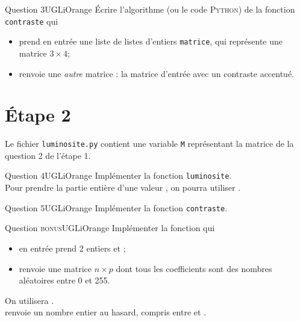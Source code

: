 \documentclass[a4paper,12pt,exos,firamath]{nsi}
\begin{document}
\begin{encadrecolore}{Question 3}{UGLiOrange}
\'Ecrire l'algorithme (ou le code \textsc{Python}) de la fonction \texttt{contraste} qui 
\begin{itemize}
	\item prend en entrée une liste de listes d'entiers \texttt{matrice}, qui représente une matrice $3\times 4$;
    \item renvoie une \textit{autre} matrice : la matrice d'entrée avec un contraste accentué.
\end{itemize}

\end{encadrecolore} 

\section*{\'Etape 2}

Le fichier \texttt{luminosite.py} contient une variable \texttt{M} représentant la matrice de la question 2 de l'étape 1.


\begin{encadrecolore}{Question 4}{UGLiOrange}
Implémenter la fonction \texttt{luminosite}.\\
Pour prendre la partie entière d'une valeur , on pourra utiliser .
\end{encadrecolore} 

\begin{encadrecolore}{Question 5}{UGLiOrange}
Implémenter la fonction \texttt{contraste}.
\end{encadrecolore} 

\begin{encadrecolore}{Question \textsc{bonus}}{UGLiOrange}
Implémenter la fonction  qui
\begin{itemize}
	\item en entrée prend 2 entiers  et ;
    \item renvoie une matrice $n\times p$ dont tous les coefficients sont des nombres aléatoires entre 0 et 255.
\end{itemize}
On utilisera .\\
 renvoie un nombre entier au hasard, compris entre  et .
\end{encadrecolore} 
\end{document}
